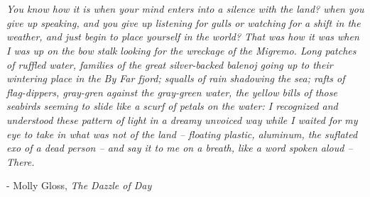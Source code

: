 \section{}

\textit{\noindent You know how it is when your mind enters into a silence with
the land? when you give up speaking, and you give up listening for gulls or
watching for a shift in the weather, and just begin to place yourself in the
world? That was how it was when I was up on the bow stalk looking for the
wreckage of the {\normalfont Migremo}. Long patches of ruffled water, families
of the great silver-backed balenoj going up to their wintering place in the By
Far fjord; squalls of rain shadowing the sea; rafts of flag-dippers, gray-gren
against the gray-green water, the yellow bills of those seabirds seeming to
slide like a scurf of petals on the water: I recognized and understood these
pattern of light in a dreamy unvoiced way while I waited for my eye to take in
what was not of the land -- floating plastic, aluminum, the suflated exo of a
dead person -- and say it to me on a breath, like a word spoken aloud --
{\normalfont There}.
}

- Molly Gloss, \emph{The Dazzle of Day}
